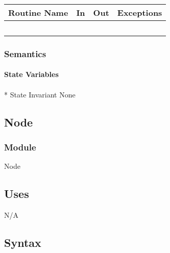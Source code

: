 \documentclass[12pt]{article}
\begin{document}
                \begin{tabular}{| l | l | l | p{5cm} |}
                \hline
                \textbf{Routine Name} & \textbf{In} & \textbf{Out} & \textbf{Exceptions}\\
                \hline
                 &  &  & ~\\
                \hline
                \end{tabular}
                
                \subsubsection* {Semantics}
                
                \paragraph* {State Variables} 
                
                \paragraph{}* {State Invariant}
                None
        
                 \newpage
                \subsection* {Node}
                
                \subsubsection*{Module}
                Node
                
                \subsection* {Uses}
                N/A
                
                \subsection* {Syntax}
                
\end{document}
